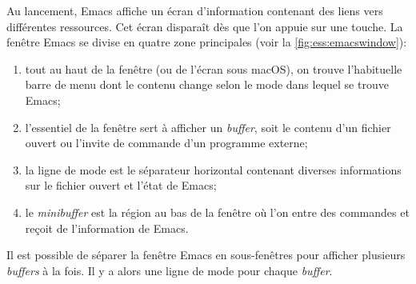 Au lancement, Emacs affiche un écran d'information contenant des liens
vers différentes ressources. Cet écran disparaît dès que l'on appuie
sur une touche. La fenêtre Emacs se divise en quatre zone principales
(voir la \autoref{fig:ess:emacswindow}):
\begin{enumerate}
\item tout au haut de la fenêtre (ou de l'écran sous macOS), on trouve
  l'habituelle barre de menu dont le contenu change selon le mode dans
  lequel se trouve Emacs;
\item l'essentiel de la fenêtre sert à afficher un \emph{buffer}, soit
  le contenu d'un fichier ouvert ou l'invite de commande d'un
  programme externe;
\item la ligne de mode est le séparateur horizontal contenant diverses
  informations sur le fichier ouvert et l'état de Emacs;
\item le \emph{minibuffer} est la région au bas de la fenêtre où l'on
  entre des commandes et reçoit de l'information de Emacs.
\end{enumerate}
Il est possible de séparer la fenêtre Emacs en sous-fenêtres pour
afficher plusieurs \emph{buffers} à la fois. Il y a alors une ligne de
mode pour chaque \emph{buffer}.

